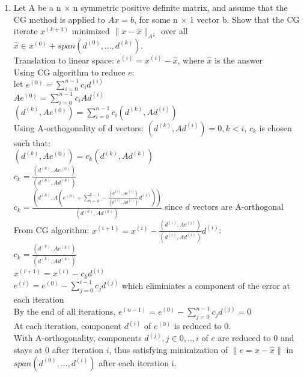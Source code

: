\documentclass[12pt,letter]{article}
\begin{document}
\begin{enumerate}
  \pagebreak
  
\item Let A be a n $\times$ n symmetric positive definite matrix, and assume that the CG method is applied to $Ax=b$, for some n $\times$ 1 vector b. Show that the CG iterate $x^{(k+1)}$ minimized $\|x-\hat{x}\|_{A^{\frac{1}{2}}}$ over all $\hat{x} \in x^{(0)} + span(d^{(0)}, ..., d^{(k)})$.\\

  Translation to linear space: $e^{(i)}=x^{(i)}-\hat{x}$, where $\hat{x}$ is the answer\\
  Using CG algorithm to reduce $e$:\\
  let $e^{(0)}=\sum_{i=0}^{n-1} c_i d^{(i)}$\\
  $Ae^{(0)}=\sum_{i=0}^{n-1} c_i A d^{(i)}$\\
  $(d^{(k)},Ae^{(0)})=\sum_{i=0}^{n-1} c_i (d^{(k)},A d^{(i)})$\\
  Using A-orthogonality of d vectors: $(d^{(k)},Ad^{(i)})=0, k<i$, $c_k$ is chosen such that:\\
  $(d^{(k)},Ae^{(0)})= c_k (d^{(k)},A d^{(k)})$\\
  $c_k= \frac{(d^{(k)},Ae^{(0)})}{(d^{(k)},Ad^{(k)})}$\\
  $c_k= \frac{(d^{(k)}, A(e^{(0)} + \sum_{i=0}^{k-1} - \frac{(d^{(i)},Ae^{(i)})}{(d^{(i)},Ad^{(i)})} d^{(i)}))}{{(d^{(k)},Ad^{(k)})}}$ since $d$ vectors are A-orthogonal\\
  From CG algorithm: $x^{(i+1)} = x^{(i)} - \frac{(d^{(i)},Ae^{(i)})}{(d^{(i)},Ad^{(i)})} d^{(i)}$:\\
  $c_k= \frac{(d^{(k)}, Ae^{(k)})}{{(d^{(k)},Ad^{(k)})}}$\\
  $x^{(i+1)} = x^{(i)} - c_k d^{(i)}$\\
  $e^{(i)}=e^{(0)}-\sum_{j=0}^{i-1}c_j d^{(j)}$ which eliminiates a component of the error at each iteration\\
  By the end of all iterations, $e^{(n-1)}=e^{(0)}-\sum_{j=0}^{n-1}c_j d^{(j)}=0$\\
  At each iteration, component $d^{(i)}$ of $e^{(0)}$ is reduced to 0.\\
  With A-orthogonality, components $d^{(j)}, j \in 0,..,i$ of $e$ are reduced to 0 and stays at 0 after iteration $i$, thus satisfying minimization of $\|e=x-\hat{x}\|$ in $span(d^{(0)}, ..., d^{(i)})$ after each iteration i.\\
  

\end{enumerate}
\end{document}
